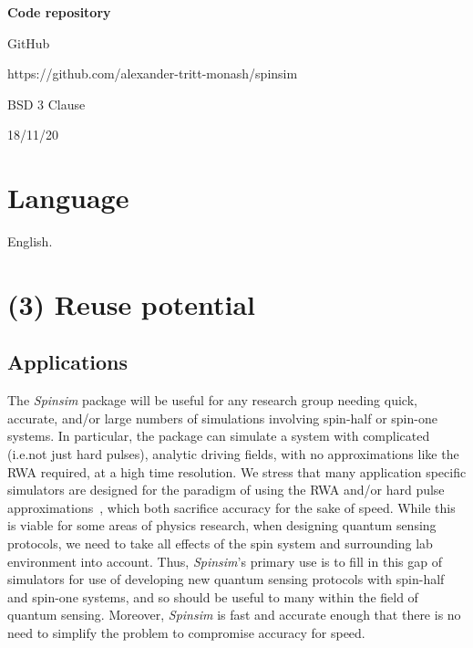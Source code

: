 \documentclass{jors}
\begin{document}
{\bf Code repository}

\begin{description}[noitemsep,topsep=0pt]
	\item[Name:] GitHub
	\item[Persistent identifier:] https://github.com/alexander-tritt-monash/spinsim
	\item[Licence:] BSD 3 Clause
	\item[Date published:] 18/11/20
\end{description}

\section{Language}

English.

\section{(3) Reuse potential}

	\subsection{Applications}
		The \emph{Spinsim} package will be useful for any research group needing quick, accurate, and/or large numbers of simulations involving spin-half or spin-one systems.
		In particular, the package can simulate a system with complicated (i.e.not just hard pulses), analytic driving fields, with no approximations like the RWA required, at a high time resolution. %
		We stress that many application specific simulators are designed for the paradigm of using the RWA and/or hard pulse approximations~\cite{suzuki_qulacs_2021, teske_qopt_2021, isakov_simulations_2021}, which both sacrifice accuracy for the sake of speed.
		While this is viable for some areas of physics research, when designing quantum sensing protocols, we need to take all effects of the spin system and surrounding lab environment into account.
		Thus, \emph{Spinsim}'s primary use is to fill in this gap of simulators for use of developing new quantum sensing protocols with spin-half and spin-one systems, and so should be useful to many within the field of quantum sensing.
		Moreover, \emph{Spinsim} is fast and accurate enough that there is no need to simplify the problem to compromise accuracy for speed.
		
\end{document}
